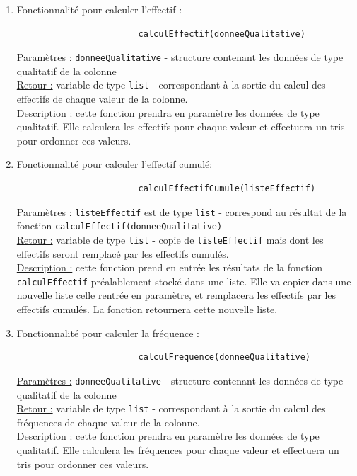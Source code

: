 		\begin{enumerate}
				\vspace{1em}\item Fonctionnalité pour calculer l'effectif :
					\begin{lstlisting}
						calculEffectif(donneeQualitative)
					\end{lstlisting}
					\underline{Paramètres :} \lstinline!donneeQualitative! - structure contenant les données de type qualitatif de la colonne\\
					\underline{Retour :} variable de type  \lstinline!list! - correspondant à la sortie du calcul des effectifs de chaque valeur de la colonne.\\
					\underline{Description :} cette fonction prendra en paramètre les données de type qualitatif. Elle calculera les effectifs pour chaque valeur et effectuera un tris pour ordonner ces valeurs.
					
				\vspace{1em}\item Fonctionnalité pour calculer l'effectif cumulé:
					\begin{lstlisting}
						calculEffectifCumule(listeEffectif)
					\end{lstlisting}
					\underline{Paramètres :} \lstinline!listeEffectif! est de type  \lstinline!list! - correspond au résultat de la fonction \lstinline!calculEffectif(donneeQualitative)!\\
					\underline{Retour :} variable de type  \lstinline!list! - copie de \lstinline!listeEffectif! mais dont les effectifs seront remplacé par les effectifs cumulés. \\
					\underline{Description :} cette fonction prend en entrée les résultats de la fonction \lstinline!calculEffectif! préalablement stocké dans une liste. Elle va copier dans une nouvelle liste celle rentrée en paramètre, et remplacera les effectifs par les effectifs cumulés. La fonction retournera cette nouvelle liste.
					
				\vspace{1em}\item Fonctionnalité pour calculer la fréquence :
					\begin{lstlisting}
						calculFrequence(donneeQualitative)
					\end{lstlisting}
					\underline{Paramètres :} \lstinline!donneeQualitative! - structure contenant les données de type qualitatif de la colonne\\
					\underline{Retour :} variable de type  \lstinline!list! - correspondant à la sortie du calcul des fréquences de chaque valeur de la colonne.\\
					\underline{Description :} cette fonction prendra en paramètre les données de type qualitatif. Elle calculera les fréquences pour chaque valeur et effectuera un tris pour ordonner ces valeurs.
					

\end{enumerate}
